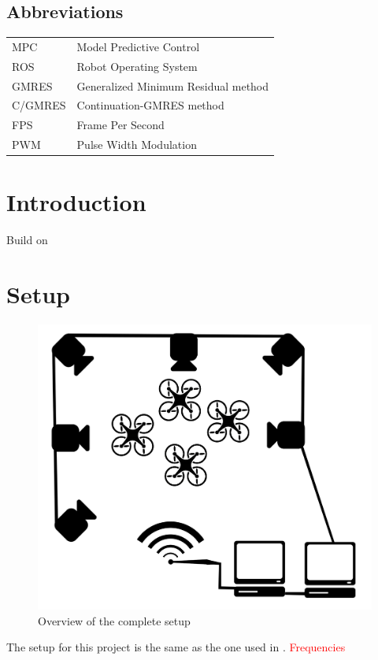 \documentclass[a4paper, 12pt]{report}
\begin{document}
\subsection*{Abbreviations}
\begin{table}[htbp]
\centering
\begin{tabular}{p{8cm} p{8cm}}
MPC \dotfill & Model Predictive Control \\
ROS \dotfill & Robot Operating System \\
GMRES \dotfill & Generalized Minimum Residual method \\
C/GMRES \dotfill & Continuation-GMRES method \\
FPS \dotfill	 & Frame Per Second \\
PWM \dotfill	 & Pulse Width Modulation \\
\end{tabular} 
\end{table}

\newpage
{}
\listoftables

\newpage
{}
\listoffigures

\newpage
\setlength{\parskip}{1.5em}
\setlength{\parindent}{1em}
\setcounter{page}{1}

\section{Introduction}
Build on \cite{Suzuki2014}

\newpage
\section{Setup}
\begin{figure}[htbp]
\centering
\includegraphics[width=.7\textwidth]{Images/setup}
\caption{Overview of the complete setup}
\label{fig:setup}
\end{figure}
The setup for this project is the same as the one used in \cite{Suzuki2014}. 
\textcolor{red}{Frequencies}
\end{document}
